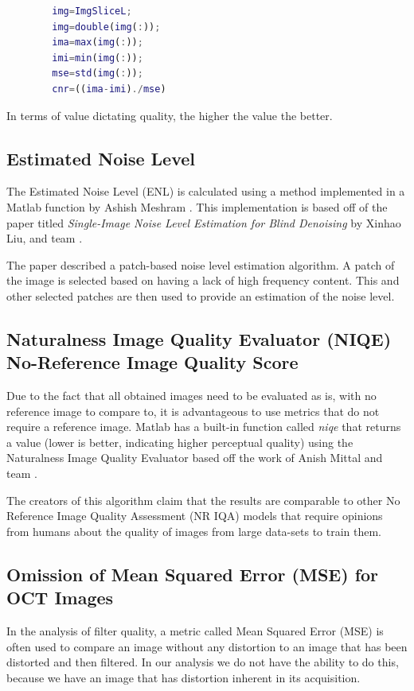\documentclass[%
reprint,
showpacs,preprintnumbers,
bibnotes,
amsmath,amssymb,
aps,
pra,
]{revtex4-1}
\begin{document}
		\begin{lstlisting}[language=Matlab, caption=Estimate Contrast to Noise Ratio, label=code:cnr]
		% Measure contrast-to-noise ratio
		img=ImgSliceL;
		img=double(img(:));
		ima=max(img(:));
		imi=min(img(:));
		mse=std(img(:));
		cnr=((ima-imi)./mse)
		\end{lstlisting}

		In terms of value dictating quality, the higher the value the better.
	\subsection{\label{sec:level2} Estimated Noise Level}
		The Estimated Noise Level (ENL) is calculated using a method implemented in a Matlab function by Ashish Meshram \cite{meshram_noise_2014}. This implementation is based off of the paper titled \textit{Single-Image Noise Level Estimation for Blind Denoising}  by Xinhao Liu, and team \cite{Liu_2013}.

		The paper described a patch-based noise level estimation algorithm. A patch of the image is selected based on having a lack of high frequency content. This and other selected patches are then used to provide an estimation of the noise level.
	\subsection{\label{sec:level2} Naturalness Image Quality Evaluator (NIQE) No-Reference Image Quality Score}

		Due to the fact that all obtained images need to be evaluated as is, with no reference image to compare to, it is advantageous to use metrics that do not require a reference image. Matlab has a built-in function called \textit{niqe} that returns a value (lower is better, indicating higher perceptual quality) using the Naturalness Image Quality Evaluator based off the work of Anish Mittal and team \cite{NIQE_2013}.

		The creators of this algorithm claim that the results are comparable to other No Reference Image Quality Assessment (NR IQA) models that require opinions from humans about the quality of images from large data-sets to train them.

  	\subsection{\label{sec:level2} Omission of Mean Squared Error (MSE) for OCT Images}

	  	In the analysis of filter quality, a metric called Mean Squared Error (MSE) is often used to compare an image without any distortion to an image that has been distorted and then filtered. In our analysis we do not have the ability to do this, because we have an image that has distortion inherent in its acquisition.
\end{document}
